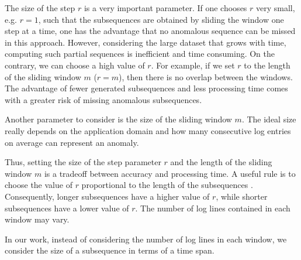 The size of the step $r$ is a very important parameter. If one chooses $r$ very small, e.g. $r = 1$, such that the subsequences are obtained by sliding the window one step at a time, one has the advantage that no anomalous sequence can be missed in this approach. However, considering the large dataset that grows with time, computing such partial sequences is inefficient and time consuming. On the contrary, we can choose a high value of $r$. For example, if we set $r$ to the length of the sliding window $m$ ($r = m$), then there is no overlap between the windows. The advantage of fewer generated subsequences and less processing time comes with a greater risk of missing anomalous subsequences. 

Another parameter to consider is the size of the sliding window $m$. The ideal size really depends on the application domain and how many consecutive log entries on average can represent an anomaly. 

Thus, setting the size of the step parameter $r$ and the length of the sliding window $m$ is a tradeoff between accuracy and processing time. A useful rule is to choose the value of $r$ proportional to the length of the subsequences \cite{izakian2013}. Consequently, longer subsequences have a higher value of $r$, while shorter subsequences have a lower value of $r$. The number of log lines contained in each window may vary. 

In our work, instead of considering the number of log lines in each window, we consider the size of a subsequence in terms of a time span.

